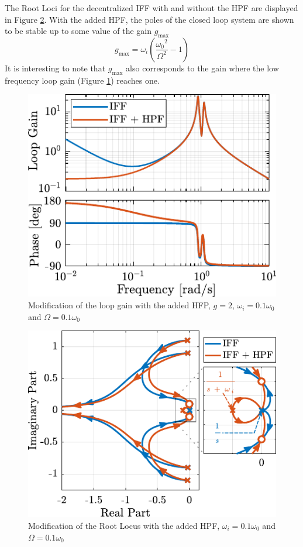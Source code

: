 \documentclass[Afour,sagev,times]{sagej}
\begin{document}
The Root Loci for the decentralized IFF with and without the HPF are displayed in Figure \ref{fig:root_locus_modified_iff}.
With the added HPF, the poles of the closed loop system are shown to be stable up to some value of the gain \(g_\text{max}\)
\begin{equation}
\label{eq:gmax_iff_hpf}
  g_{\text{max}} = \omega_i \left( \frac{{\omega_0}^2}{\Omega^2} - 1 \right)
\end{equation}
It is interesting to note that \(g_{\text{max}}\) also corresponds to the gain where the low frequency loop gain (Figure \ref{fig:loop_gain_modified_iff}) reaches one.

\begin{figure}[htbp]
\centering
\includegraphics[scale=1]{figs/loop_gain_modified_iff.pdf}
\caption{\label{fig:loop_gain_modified_iff}Modification of the loop gain with the added HFP, \(g = 2\), \(\omega_i = 0.1 \omega_0\) and \(\Omega = 0.1 \omega_0\)}
\end{figure}

\begin{figure}[htbp]
\centering
\includegraphics[scale=1]{figs/root_locus_modified_iff.pdf}
\caption{\label{fig:root_locus_modified_iff}Modification of the Root Locus with the added HPF, \(\omega_i = 0.1 \omega_0\) and \(\Omega = 0.1 \omega_0\)}
\end{figure}
\end{document}
